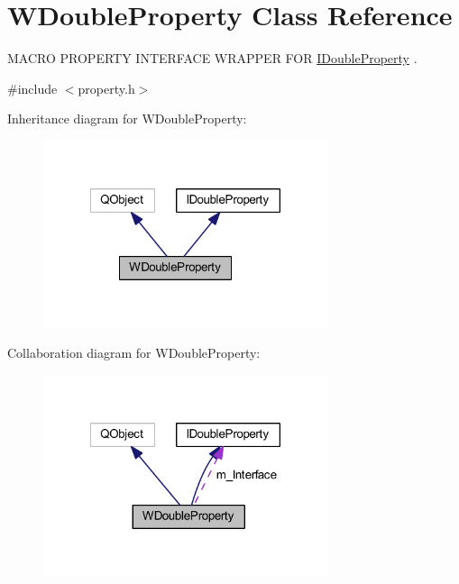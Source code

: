 \hypertarget{class_w_double_property}{\section{W\-Double\-Property Class Reference}
\label{class_w_double_property}
}


M\-A\-C\-R\-O P\-R\-O\-P\-E\-R\-T\-Y I\-N\-T\-E\-R\-F\-A\-C\-E W\-R\-A\-P\-P\-E\-R F\-O\-R \hyperlink{class_i_double_property}{I\-Double\-Property} .  




{\ttfamily \#include $<$property.\-h$>$}



Inheritance diagram for W\-Double\-Property\-:
\nopagebreak
\begin{figure}[H]
\begin{center}
\leavevmode
\includegraphics[width=237pt]{class_w_double_property__inherit__graph}
\end{center}
\end{figure}


Collaboration diagram for W\-Double\-Property\-:
\nopagebreak
\begin{figure}[H]
\begin{center}
\leavevmode
\includegraphics[width=237pt]{class_w_double_property__coll__graph}
\end{center}
\end{figure}
